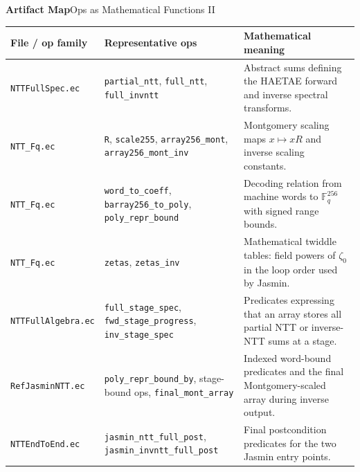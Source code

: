 \documentclass[10pt,aspectratio=1610,compress,dvipsnames]{beamer}
\newcommand{\ec}[1]{\texttt{#1}}
\begin{document}
\begin{frame}{\bfseries Artifact Map}{Ops as Mathematical Functions II}
\begin{center}
\tiny\renewcommand{\arraystretch}{1.11}
\setlength{\tabcolsep}{3pt}
\begin{tabular}{p{3.0cm}p{3.7cm}p{5.3cm}}
\toprule[1.2pt]
\textbf{File / op family} & \textbf{Representative ops} & \textbf{Mathematical meaning} \\
\midrule
\ec{NTTFullSpec.ec} & \ec{partial\_ntt}, \ec{full\_ntt},
\ec{full\_invntt} & Abstract sums defining the HAETAE forward and inverse
spectral transforms. \\
\ec{NTT\_Fq.ec} & \ec{R}, \ec{scale255}, \ec{array256\_mont},
\ec{array256\_mont\_inv} & Montgomery scaling maps $x\mapsto xR$ and inverse
scaling constants. \\
\ec{NTT\_Fq.ec} & \ec{word\_to\_coeff}, \ec{barray256\_to\_poly},
\ec{poly\_repr\_bound} & Decoding relation from machine words to
$\mathbb{F}_q^{256}$ with signed range bounds. \\
\ec{NTT\_Fq.ec} & \ec{zetas}, \ec{zetas\_inv} & Mathematical twiddle tables:
field powers of $\zeta_0$ in the loop order used by Jasmin. \\
\ec{NTTFullAlgebra.ec} & \ec{full\_stage\_spec}, \ec{fwd\_stage\_progress},
\ec{inv\_stage\_spec} & Predicates expressing that an array stores all partial
NTT or inverse-NTT sums at a stage. \\
\ec{RefJasminNTT.ec} & \ec{poly\_repr\_bound\_by}, stage-bound ops,
\ec{final\_mont\_array} & Indexed word-bound predicates and the final
Montgomery-scaled array during inverse output. \\
\ec{NTTEndToEnd.ec} & \ec{jasmin\_ntt\_full\_post},
\ec{jasmin\_invntt\_full\_post} & Final postcondition predicates for the two
Jasmin entry points. \\
\bottomrule[1.2pt]
\end{tabular}
\end{center}
\end{frame}
\end{document}
